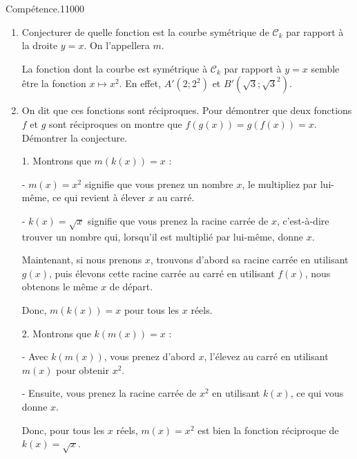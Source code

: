 \begin{pageParcourst}
\begin{ExoCtN}{Compétence.}{1}{1}{0}{0}{0}
\begin{enumerate}
L'abscisse de $A$ est l'ordonnée de $A'$ et vice versa, de même que pour $B$ et $B'$.
\item Conjecturer de quelle fonction est la courbe symétrique de $\mathcal{C}_k$ par rapport à la droite $y=x$. On l'appellera $m$.

La fonction dont la courbe est symétrique à $\mathcal{C}_k$ par rapport à $y=x$ semble être la fonction $x\mapsto x^2$. En effet, $A'(2;2^2)$ et $B'(\sqrt{3};\sqrt{3}^2)$.

\item On dit que ces fonctions sont réciproques. Pour démontrer que deux fonctions $f$ et $g$ sont réciproques on montre que $f(g(x))=g(f(x))=x$. Démontrer la conjecture.

1. Montrons que \(m(k(x)) = x\) :

   - \(m(x) = x^2\) signifie que vous prenez un nombre \(x\), le multipliez par lui-même, ce qui revient à élever \(x\) au carré.
   
   - \(k(x) = \sqrt{x}\) signifie que vous prenez la racine carrée de \(x\), c'est-à-dire trouver un nombre qui, lorsqu'il est multiplié par lui-même, donne \(x\).
   
   Maintenant, si nous prenons \(x\), trouvons d'abord sa racine carrée en utilisant \(g(x)\), puis élevons cette racine carrée au carré en utilisant \(f(x)\), nous obtenons le même \(x\) de départ.

   Donc, \(m(k(x)) = x\) pour tous les \(x\) réels.

2. Montrons que \(k(m(x)) = x\) :

   - Avec \(k(m(x))\), vous prenez d'abord \(x\), l'élevez au carré en utilisant \(m(x)\) pour obtenir \(x^2\).
   
   - Ensuite, vous prenez la racine carrée de \(x^2\) en utilisant \(k(x)\), ce qui vous donne  \(x\).

Donc, pour tous les \(x\) réels, \(m(x) = x^2\) est bien la fonction réciproque de \(k(x) = \sqrt{x}\).

\end{enumerate}


\end{ExoCtN}
\end{pageParcourst}
